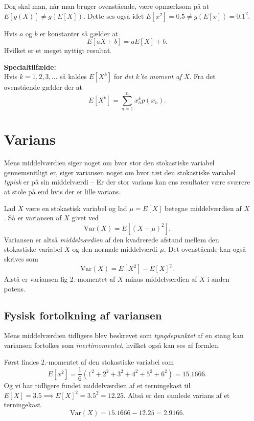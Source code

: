 Dog skal man, når man bruger ovenstående, være opmærksom på at $E[g(X)] \neq g(E[X])$. Dette ses også idet $E[x^2] = \num{0,5} \neq g(E[x]) = \num{0,1}^2$.

\begin{sæt}
  Hvis $a$ og $b$ er konstanter så gælder at
  \[ 
    E[aX + b] = aE[X] + b
  .\]
  Hvilket er et meget nyttigt resultat. 

  \vspace{14pt} 

  \textbf{Specialtilfælde:} \hfill \\
  Hvis $k = 1,2,3, \ldots $ så kaldes $E \left[ X^k \right]$ for \textit{det $k$'te moment af $X$}. Fra det ovenstående gælder der at
  \[ 
  E \left[ X^k \right] = \sum_{n = 1}^{n} x_n^k p(x_n)
  .\]
\end{sæt}

\section{Varians}
Mens middelværdien siger noget om hvor stor den stokastiske variabel gennemsnitligt er, siger variansen noget om hvor tæt den stokastiske variabel \textit{typisk} er på sin middelværdi -- Er der stor varians kan ens resultater være sværere at stole på end hvis der er lille varians.

\begin{definition}
  Lad $X$ være en stokastisk variabel og lad $\mu = E[X]$ betegne middelværdien af $X$. Så er variansen af $X$ givet ved 
  \[ 
    \mathrm{Var}(X) = E[(X-\mu)^2]
  .\]
  Variansen er altså \textit{middelværdien} af den kvadrerede afstand mellem den stokastiske variabel $X$ og den normale middelværdi $\mu$. Det ovenstående kan også skrives som
  \[ 
    \mathrm{Var}(X) = E[X^2] - E[X]^2
  .\]
  Alstå er variansen lig 2.-momentet af $X$ minus middelværdien af $X$ i anden potens.
\end{definition}

\subsection{Fysisk fortolkning af variansen}
Mens middelværdien tidligere blev beskrevet som \textit{tyngdepunktet} af en stang kan variansen fortolkes som \textit{inertimomentet}, hvilket også kan ses af formlen. 

\begin{eks}
  Først findes 2.-momentet af den stokastiske variabel som
  \[ 
  E \left[ x^2 \right] = \frac{1}{6} \left( 1^2 + 2^2 + 3^2 + 4^2 + 5^2 + 6^2 \right) = \num{15,1666} 
  .\]
  Og vi har tidligere fundet middelværdien af et terningekast til $E[X] = \num{3,5}  \implies E[X]^2 = \num{3,5}^2 = \num{12,25}$. Altså er den samlede varians af et terningekast
  \[ 
    \mathrm{Var}(X) = \num{15,1666} - \num{12,25}  = \num{2,9166} 
  .\]
\end{eks}

